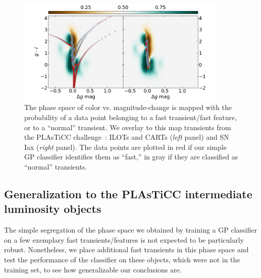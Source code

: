 \documentclass[letterpaper,longauthor,trackchanges,twocolumn,onecolappendix,sort&compress]{aastex62}
\begin{document}
\begin{figure}
    \begin{center}
    \includegraphics[width=0.9\textwidth]{figures/GPclassifierPLASTICC_40_00.png}
    \caption{The phase space of color vs. magnitude-change is mapped with the probability of a data point belonging to a fast transient/fast feature, or to a ``normal'' transient. We overlay to this map transients from the PLAsTiCC challenge~\citep{plasticc}: ILOTs and CARTs (\emph{left} panel) and SN Iax (\emph{right} panel). The data points are plotted in red if our simple GP classifier identifies them as ``fast,'' in gray if they are classified as ``normal'' transients.}
    \end{center}
    \label{fig:PLAsTiCC}
\end{figure}



\subsection{Generalization to the PLAsTiCC intermediate luminosity objects}
The simple segregation of the phase space we obtained by training a GP classifier on a few exemplary fast transients/features is not expected to be particularly robust. Nonetheless, we place additional fast transients in this phase space and test the performance of the classifier on these objects, which were not in the training set, to see how generalizable our conclusions are. 
\end{document}
